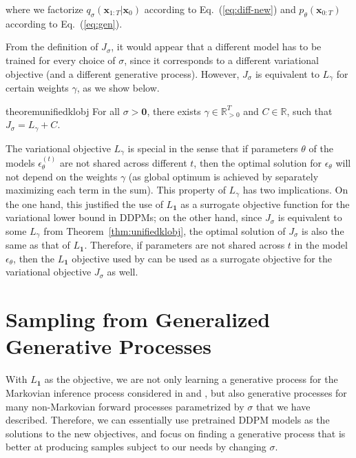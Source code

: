 where we factorize $q_\sigma({\bm{x}}_{1:T} | {\bm{x}}_0)$ according to Eq.~(\ref{eq:diff-new}) and $p_\theta({\bm{x}}_{0:T})$ according to Eq.~(\ref{eq:gen}).

From the definition of $J_\sigma$, it would appear that a different model has to be trained for every choice of $\sigma$, since it corresponds to a different variational objective (and a different generative process). However, $J_\sigma$ is equivalent to $L_\gamma$ for certain weights $\gamma$, as we show below.

\begin{restatable}{theorem}{unifiedklobj}
\label{thm:unifiedklobj}
For all $\sigma > {\bm{0}}$, there exists $\gamma \in \mathbb{R}_{> 0}^{T}$ and $C \in \mathbb{R}$, such that $J_\sigma = L_\gamma + C$.
\end{restatable}

The variational objective $L_\gamma$ is special in the sense that if parameters $\theta$ 
of the models $\epsilon_\theta^{(t)}$ 
are not shared across different $t$, then the optimal solution for $\epsilon_\theta$ will not depend on the weights $\gamma$ (as global optimum is achieved by separately maximizing each term in the sum). This property of $L_\gamma$ has two implications. On the one hand, this justified the use of $L_{\bm{1}}$ as a surrogate objective function for the variational lower bound in DDPMs; on the other hand, since $J_\sigma$ is equivalent to some $L_\gamma$ from Theorem~\ref{thm:unifiedklobj}, the optimal solution of $J_\sigma$ is also the same as that of $L_{\bm{1}}$. 
Therefore, if parameters are not shared across $t$ in the model $\epsilon_\theta$, then the $L_{\bm{1}}$ objective used by \citet{ho2020denoising} can be used as a surrogate objective for the variational objective $J_\sigma$ as well. 

\section{Sampling from Generalized Generative Processes}\label{sec:sampling}
With $L_{\bm{1}}$ as the objective, we are not only learning a generative process for the Markovian inference process considered in \citet{sohl-dickstein2015deep} and \citet{ho2020denoising}, but also generative processes for many non-Markovian forward processes parametrized by $\sigma$ 
that we have described. Therefore, we can essentially use pretrained DDPM models as the solutions to the new objectives, and focus on finding a generative process that is better at producing samples subject to our needs by changing $\sigma$. 

